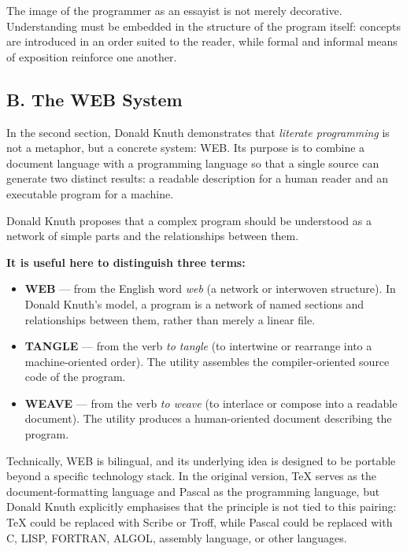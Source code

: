 \documentclass{ZGJournalArticle_2026}
\providecommand{\tightlist}{%
  \setlength{\itemsep}{0pt}\setlength{\parskip}{0pt}}
\begin{document}
The image of the programmer as an essayist is not merely decorative.
Understanding must be embedded in the structure of the program itself:
concepts are introduced in an order suited to the reader, while formal
and informal means of exposition reinforce one another.

\subsection{B. The WEB System}\label{b.-the-web-system}

In the second section, Donald Knuth demonstrates that \emph{literate
programming} is not a metaphor, but a concrete system: WEB. Its purpose
is to combine a document language with a programming language so that a
single source can generate two distinct results: a readable description
for a human reader and an executable program for a machine.

Donald Knuth proposes that a complex program should be understood as a
network of simple parts and the relationships between them.

\textbf{It is useful here to distinguish three terms:}

\begin{itemize}
\tightlist
\item
  \textbf{WEB} --- from the English word \emph{web} (a network or
  interwoven structure). In Donald Knuth's model, a program is a network
  of named sections and relationships between them, rather than merely a
  linear file.
\item
  \textbf{TANGLE} --- from the verb \emph{to tangle} (to intertwine or
  rearrange into a machine-oriented order). The utility assembles the
  compiler-oriented source code of the program.
\item
  \textbf{WEAVE} --- from the verb \emph{to weave} (to interlace or
  compose into a readable document). The utility produces a
  human-oriented document describing the program.
\end{itemize}

Technically, WEB is bilingual, and its underlying idea is designed to be
portable beyond a specific technology stack. In the original version,
TeX serves as the document-formatting language and Pascal as the
programming language, but Donald Knuth explicitly emphasises that the
principle is not tied to this pairing: TeX could be replaced with Scribe
or Troff, while Pascal could be replaced with C, LISP, FORTRAN, ALGOL,
assembly language, or other languages.
\end{document}
